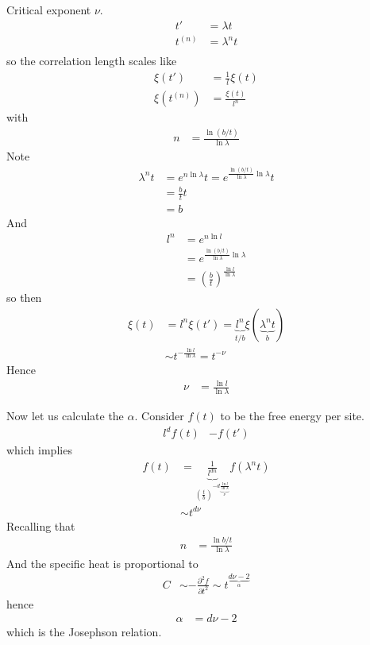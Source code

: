 Critical exponent $\nu$.
\begin{align}
    t' &= \lambda t\\
    t^{(n)} &= \lambda^n t\\
\end{align}
so the correlation length scales like
\begin{align}
    \xi\left( t' \right) &= \frac{1}{l} \xi\left( t \right)\\
    \xi\left( t^{(n)} \right)
    &=
    \frac{\xi\left( t \right)}{l^n}
\end{align}
with
\begin{align}
    n
    &=
    \frac{\ln \left( b/t \right)}{\ln \lambda}
\end{align}
Note
\begin{align}
    \lambda^n t
    &=
    e^{n \ln \lambda} t
    =
    e^{\frac{\ln (b/t)}{\ln \lambda} \ln \lambda} t\\
    &=
    \frac{b}{t} t\\
    &= b
\end{align}
And
\begin{align}
    l^n &=
    e^{n\ln l}\\
    &=
    e^{\frac{\ln(b/t)}{\ln \lambda} \ln \lambda}\\
    &=
    \left( \frac{b}{t} \right)^{\frac{\ln l}{\ln \lambda}}
\end{align}
so then
\begin{align}
    \xi\left( t \right)
    &=
    l^n \xi\left( t' \right)
    =
    \underbrace{l^n}_{t/b}
    \xi\left( \underbrace{\lambda^n t}_{b} \right)\\
    &\sim
    t^{- \frac{\ln l}{\ln \lambda}} = t^{-\nu}
\end{align}
Hence
\begin{align}
    \nu &=
    \frac{\ln l}{\ln \lambda}
\end{align}

Now let us calculate the $\alpha$.
Consider $f(t)$ to be the free energy per site.
\begin{align}
    l^d f(t)
    &-
    f\left( t' \right)
\end{align}
which implies
\begin{align}
    f(t)
    &=
    \underbrace{
    \frac{1}{l^{dn}}
    }_{
    \left( \frac{t}{b} \right)^{-d \underbrace{
    \frac{\ln l}{\ln \lambda}}_{
    \nu
    }}
    }
    f\left( \lambda^n t \right)\\
    &\sim t^{d\nu}
\end{align}
Recalling that
\begin{align}
    n &=
    \frac{\ln b/t}{\ln \lambda}
\end{align}
And the specific heat is proportional to
\begin{align}
    C &\sim
    -\frac{\partial^2 f}{\partial t^2}
    \sim
    t^{\underbrace{d\nu - 2}_{\alpha}}
\end{align}
hence
\begin{align}
    \alpha &= d\nu - 2
\end{align}
which is the Josephson relation.
